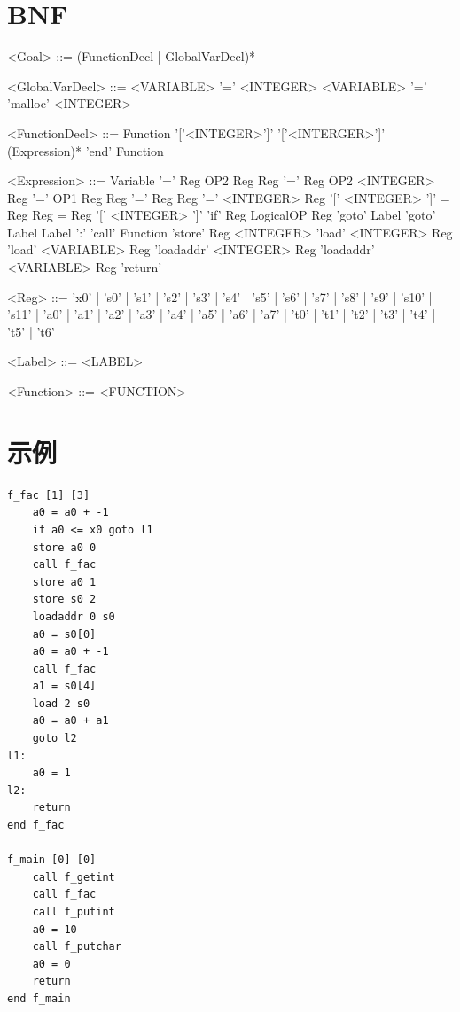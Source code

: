 \documentclass{ctexart}
\newenvironment{typewriterfont}{\ttfamily}{\par}
\begin{document}
\section{BNF}
\setlength{\grammarindent}{8em} %
\begin{typewriterfont}
\begin{grammar}
<Goal>  ::= (FunctionDecl | GlobalVarDecl)*

<GlobalVarDecl> ::= <VARIABLE> '=' <INTEGER>
\alt <VARIABLE> '=' 'malloc' <INTEGER>

<FunctionDecl> ::= Function '['<INTEGER>']' '['<INTERGER>']' (Expression)* 'end' Function

<Expression>	::=	Variable '=' Reg OP2 Reg
\alt Reg '=' Reg OP2 <INTEGER>
\alt Reg '=' OP1 Reg
\alt Reg '=' Reg
\alt Reg '=' <INTEGER>
\alt Reg '[' <INTEGER> ']' = Reg
\alt Reg = Reg '[' <INTEGER> ']'
\alt 'if' Reg LogicalOP Reg 'goto' Label
\alt 'goto' Label
\alt Label ':'
\alt 'call' Function
\alt 'store' Reg <INTEGER>
\alt 'load' <INTEGER> Reg
\alt 'load' <VARIABLE> Reg
\alt 'loadaddr' <INTEGER> Reg
\alt 'loadaddr' <VARIABLE> Reg
\alt 'return'

<Reg> ::= 'x0'
| 's0'
| 's1'
| 's2'
| 's3'
| 's4'
| 's5'
| 's6'
| 's7'
| 's8'
| 's9'
| 's10'
| 's11'
| 'a0'
| 'a1'
| 'a2'
| 'a3'
| 'a4'
| 'a5'
| 'a6'
| 'a7'
| 't0'
| 't1'
| 't2'
| 't3'
| 't4'
| 't5'
| 't6'

<Label> ::= <LABEL>

<Function> ::= <FUNCTION>

\end{grammar}
\end{typewriterfont}

\newpage
\section{示例}
\begin{typewriterfont}
\begin{lstlisting}
f_fac [1] [3]
    a0 = a0 + -1
    if a0 <= x0 goto l1
    store a0 0
    call f_fac
    store a0 1
    store s0 2
    loadaddr 0 s0
    a0 = s0[0]
    a0 = a0 + -1
    call f_fac
    a1 = s0[4]
    load 2 s0
    a0 = a0 + a1
    goto l2
l1:
    a0 = 1
l2:
    return
end f_fac

f_main [0] [0]
    call f_getint
    call f_fac
    call f_putint
    a0 = 10
    call f_putchar
    a0 = 0
    return
end f_main
\end{lstlisting}
\end{typewriterfont}
\end{document}
